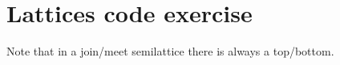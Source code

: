 \section{Lattices code exercise}




Note that in a join/meet semilattice there is always a top/bottom.
